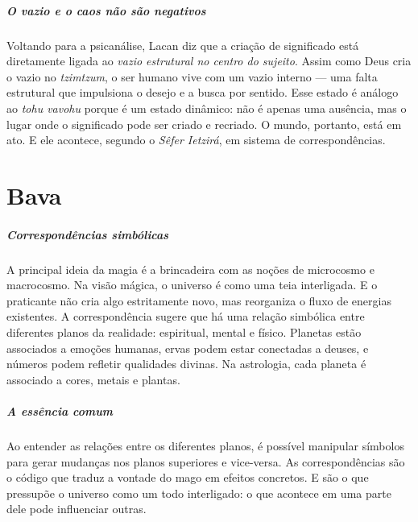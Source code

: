 \paragraph{O vazio e o caos não são negativos} Voltando para a psicanálise, Lacan diz que a criação de significado está diretamente ligada ao \textit{vazio estrutural no centro do sujeito}. Assim como Deus cria o vazio no \textit{tzimtzum}, o ser humano vive com um vazio interno --- uma falta estrutural que impulsiona o desejo e a busca por sentido. Esse estado é análogo ao \textit{tohu vavohu} porque é um estado dinâmico: não é apenas uma ausência, mas o lugar onde o significado pode ser criado e recriado. O mundo, portanto, está em ato. E ele acontece, segundo o \textit{Sêfer Ietzirá}, em sistema de correspondências.

\chapter*{Bava \smallskip{}}

\begin{center}
{\huge{}}
\end{center}


\paragraph{Correspondências simbólicas} A principal ideia da magia é a brincadeira com as noções de microcosmo e macrocosmo. Na visão mágica, o universo é como uma teia interligada. E o praticante não cria algo estritamente novo, mas reorganiza o fluxo de energias existentes. A correspondência sugere que há uma relação simbólica entre diferentes planos da realidade: espiritual, mental e físico. Planetas estão associados a emoções humanas, ervas podem estar conectadas a deuses, e números podem refletir qualidades divinas. Na astrologia, cada planeta é associado a cores, metais e plantas. %

\paragraph{A essência comum} Ao entender as relações entre os diferentes planos, é possível manipular símbolos para gerar mudanças nos planos superiores e vice-versa. As correspondências são o código que traduz a vontade do mago em efeitos concretos. E são o que pressupõe o universo como um todo interligado: o que acontece em uma parte dele pode influenciar outras.

